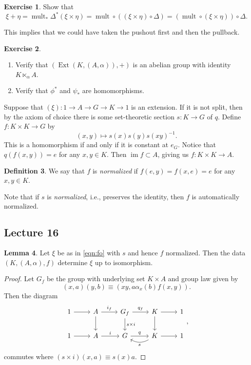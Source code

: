 \documentclass[10pt,letterpaper,cm]{nupset}
\theoremstyle{definition}
\newtheorem{definition}{Definition}[subsection]
\theoremstyle{theorem}
\newtheorem{lemma}[definition]{Lemma}
\newtheorem{exercise}[definition]{Exercise}
\theoremstyle{remark}
\newcommand{\1}{\mathbf{1}}
\newcommand{\0}{\vec 0}
\DeclareMathOperator{\mult}{mult}
\DeclareMathOperator{\ext}{Ext}
\DeclareMathOperator{\im}{im}
\begin{document}
\begin{exercise}
Show that $$\xi + \eta = \mult_{\ast} \Delta^{\ast}(\xi \times \eta) = \mult \circ \left(\left(\xi \times \eta\right)\circ \Delta\right) = \left(\mult \circ (\xi \times \eta)\right)\circ \Delta.$$ 
\end{exercise}

This implies that we could have taken the pushout first and then the pullback.

\begin{exercise} $ $
\begin{enumerate}
\item Verify that $\left(\ext(K, (A, \alpha)), +\right)$ is an abelian group with identity $K \ltimes_{\alpha} A$. 
\item Verify that $\phi^{\ast}$ and $\psi_{\ast}$ are homomorphisms.  
\end{enumerate}
\end{exercise}

\medskip

Suppose that $\left(\xi\right) : 1\to A \to G \to K \to 1$ is an extension. If it is not split, then by the axiom of choice there is some set-theoretic section $s: K \to G$ of $q$.
Define $f : K \times K\to G$ by $$\left(x,y\right) \mapsto s(x)s(y)s(xy)^{-1}.$$ This is a homomorphism if and only if it is constant at $e_G$. Notice that $q(f(x,y)) = e$ for any $x,y\in K$. Then $\im{f} \subset A$, giving us  $f: K\times K \to A$.
\begin{definition}
We say that $f$ is \textit{normalized} if $f(e, y) = f(x, e) =e$ for any $x,y \in K$.
\end{definition}
Note that if $s$ is \textit{normalized}, i.e., preserves the identity, then $f$ is automatically normalized.


\subsection{Lecture 16}

\begin{lemma} 
Let $\xi$ be as in \eqref{eqn:fo} with $s$ and hence $f$ normalized. Then the data $\left(K, (A, \alpha), f\right)$ determine $\xi$ up to isomorphism.
\end{lemma}
\begin{proof}
Let $G_f$ be the group with underlying set $K \times A$ and group law given by $$\left(x, a\right)\left(y, b\right) \equiv \left(xy, a \alpha_x(b)f(x,y)\right).$$ Then the diagram
\[
\begin{tikzcd}
1 \arrow[r] & A \arrow[r, "i_f"] \arrow[d] & G_f \arrow[d, "s\times i"] \arrow[r, "q_f"] & K \arrow[r] \arrow[d] & 1 \\
1 \arrow[r] & A \arrow[r, "i"] & G \arrow[r, "q"] & K \arrow[r] \arrow[l, "s", bend left] & 1
\end{tikzcd},
\]
commutes where $\left(s\times i\right)(x, a) \equiv s(x)a$.
\end{proof}
\end{document}
